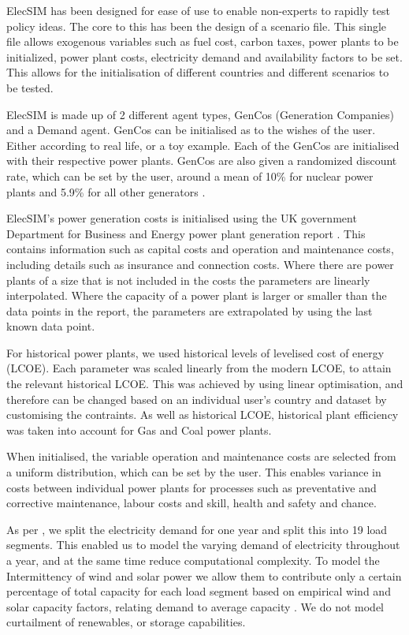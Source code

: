
ElecSIM has been designed for ease of use to enable non-experts to rapidly test policy ideas. The core to this has been the design of a scenario file. This single file allows exogenous variables such as fuel cost, carbon taxes, power plants to be initialized, power plant costs, electricity demand and availability factors to be set. This allows for the initialisation of different countries and different scenarios to be tested.

ElecSIM is made up of 2 different agent types, GenCos (Generation Companies) and a Demand agent. GenCos can be initialised as to the wishes of the user. Either according to real life, or a toy example. Each of the GenCos are initialised with their respective power plants. GenCos are also given a randomized discount rate, which can be set by the user, around a mean of 10\% for nuclear power plants \cite{Paper2012} and 5.9\% for all other generators \cite{KPMG2017}.

ElecSIM's power generation costs is initialised using the UK government Department for Business and Energy power plant generation report \cite{Department2016}. This contains information such as capital costs and operation and maintenance costs, including details such as insurance and connection costs. Where there are power plants of a size that is not included in the  costs the parameters are linearly interpolated. Where the capacity of a power plant is larger or smaller than the data points in the report, the parameters are extrapolated by using the last known data point.

For historical power plants, we used historical levels of levelised cost of energy (LCOE). Each parameter was scaled linearly from the modern LCOE, to attain the relevant historical LCOE. This was achieved by using linear optimisation, and therefore can be changed based on an individual user's country and dataset by customising the contraints. As well as historical LCOE, historical plant efficiency was taken into account for Gas and Coal power plants.

When initialised, the variable operation and maintenance costs are selected from a uniform distribution, which can be set by the user. This enables variance in costs between individual power plants for processes such as preventative and corrective maintenance, labour costs and skill, health and safety and chance.  

As per \cite{Chappin2017}, we split the electricity demand for one year and split this into 19 load segments. This enabled us to model the varying demand of electricity throughout a year, and at the same time reduce computational complexity. To model the Intermittency of wind and solar power we allow them to contribute only a certain percentage of total capacity for each load segment based on empirical wind and solar capacity factors, relating demand to average capacity \cite{Pfenninger2016, Staffell2016, Chappin2017}. We do not model curtailment of renewables, or storage capabilities.

